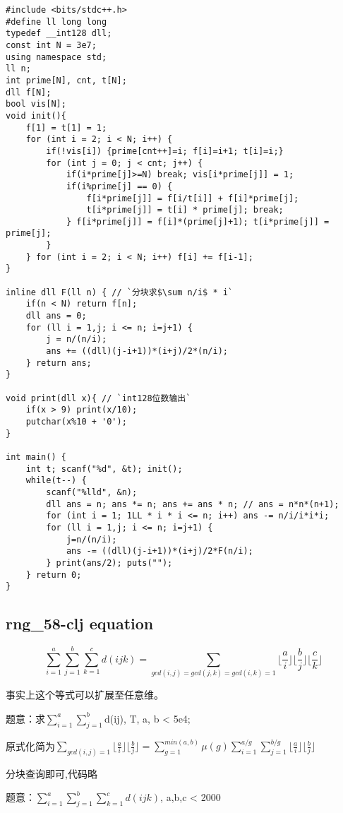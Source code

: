 \begin{lstlisting}
#include <bits/stdc++.h>
#define ll long long
typedef __int128 dll;
const int N = 3e7;
using namespace std;
ll n;
int prime[N], cnt, t[N];
dll f[N];
bool vis[N]; 
void init(){
    f[1] = t[1] = 1;
    for (int i = 2; i < N; i++) {
        if(!vis[i]) {prime[cnt++]=i; f[i]=i+1; t[i]=i;}
        for (int j = 0; j < cnt; j++) {
            if(i*prime[j]>=N) break; vis[i*prime[j]] = 1;
            if(i%prime[j] == 0) {
                f[i*prime[j]] = f[i/t[i]] + f[i]*prime[j];
                t[i*prime[j]] = t[i] * prime[j]; break;
            } f[i*prime[j]] = f[i]*(prime[j]+1); t[i*prime[j]] = prime[j];
        }
    } for (int i = 2; i < N; i++) f[i] += f[i-1];
}
 
inline dll F(ll n) { // `分块求$\sum n/i$ * i`
    if(n < N) return f[n];
    dll ans = 0;
    for (ll i = 1,j; i <= n; i=j+1) {
        j = n/(n/i);
        ans += ((dll)(j-i+1))*(i+j)/2*(n/i);
    } return ans;
}
 
void print(dll x){ // `int128位数输出`
    if(x > 9) print(x/10);
    putchar(x%10 + '0');
}
 
int main() {
    int t; scanf("%d", &t); init();
    while(t--) {
        scanf("%lld", &n);
        dll ans = n; ans *= n; ans += ans * n; // ans = n*n*(n+1);
        for (int i = 1; 1LL * i * i <= n; i++) ans -= n/i/i*i*i;
        for (ll i = 1,j; i <= n; i=j+1) {
            j=n/(n/i);
            ans -= ((dll)(j-i+1))*(i+j)/2*F(n/i);
        } print(ans/2); puts("");
    } return 0;
}
\end{lstlisting}

\subsection{rng\_58-clj equation}

$$
\sum_{i=1}^a\sum_{j=1}^b\sum_{k=1}^cd(ijk) = \sum_{gcd(i,j)=gcd(j,k)=gcd(i,k)=1} \lfloor \frac{a}{i} \rfloor \lfloor \frac{b}{j} \rfloor \lfloor \frac{c}{k} \rfloor
$$


事实上这个等式可以扩展至任意维。

题意：求$\sum_{i=1}^a \sum_{j=1}^b$d(ij), T, a, b < 5e4;

原式化简为$\sum_{gcd(i,j)=1}\lfloor \frac{a}{i} \rfloor \lfloor \frac{b}{j} \rfloor = \sum_{g=1}^{min(a,b)} \mu(g) \sum_{i=1}^{a/g} \sum_{j=1}^{b/g}\lfloor \frac{a}{i} \rfloor \lfloor \frac{b}{j} \rfloor$

分块查询即可,代码略

题意：$\sum\limits_{i=1}^a\sum\limits_{j=1}^b\sum\limits_{k=1}^c d(ijk)$, a,b,c < 2000

